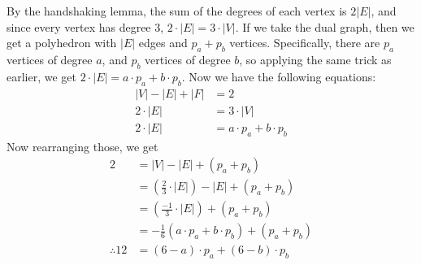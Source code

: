 \documentclass[12pt]{article}
\begin{document}
\section{}
\noindent{}\bigskip\par
By the handshaking lemma, the sum of the degrees of each vertex is $2|E|$, and since every vertex has degree 3, $2 \cdot |E|=3 \cdot |V|$. If we take the dual graph, then we get a polyhedron with $|E|$ edges and $p_a + p_b$ vertices. Specifically, there are $p_a$ vertices of degree $a$, and $p_b$ vertices of degree $b$, so applying the same trick as earlier, we get $2 \cdot |E| = a \cdot p_a + b \cdot p_b$. Now we have the following equations:
\begin{align*}
    |V|-|E|+|F| &=2 \\
    2 \cdot |E| &=3 \cdot |V| \\
    2 \cdot |E| &= a \cdot p_a + b \cdot p_b
\end{align*}
Now rearranging those, we get
\begin{align*}
    2 &= |V| - |E| + \left( p_a + p_b \right) \\
      &= \left( \frac{2}{3} \cdot |E| \right) - |E| + \left( p_a + p_b \right) \\
      &= \left( \frac{-1}{3} \cdot |E| \right) + \left( p_a + p_b \right) \\
      &= - \frac{1}{6} \left( a \cdot p_a + b \cdot p_b \right) + (p_a + p_b) \\
    \therefore 12 &= (6 - a) \cdot p_a + (6 - b) \cdot p_b
\end{align*}

\section{}
\noindent{}\bigskip\par
\end{document}

